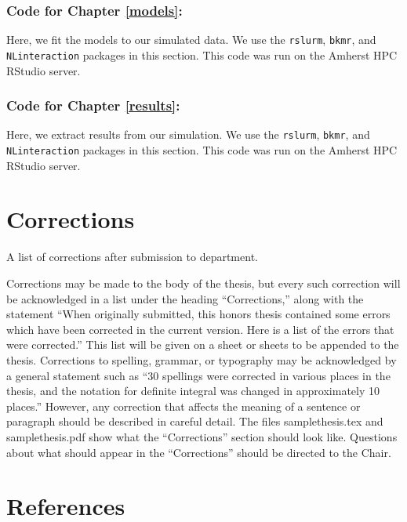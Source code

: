 \documentclass[12pt, twoside]{amherstthesis}
\begin{document}
\hypertarget{code-for-chapter-refmodels}{%
\subsection{Code for Chapter \ref{models}:}\label{code-for-chapter-refmodels}}

Here, we fit the models to our simulated data. We use the \texttt{rslurm}, \texttt{bkmr}, and \texttt{NLinteraction} packages in this section. This code was run on the Amherst HPC RStudio server.

\hypertarget{code-for-chapter-refresults}{%
\subsection{Code for Chapter \ref{results}:}\label{code-for-chapter-refresults}}

Here, we extract results from our simulation. We use the \texttt{rslurm}, \texttt{bkmr}, and \texttt{NLinteraction} packages in this section. This code was run on the Amherst HPC RStudio server.

\hypertarget{corrections}{%
\chapter*{Corrections}\label{corrections}}

A list of corrections after submission to department.

Corrections may be made to the body of the thesis, but every such correction will be acknowledged in a list under the heading ``Corrections,'' along with the statement ``When originally submitted, this honors thesis contained some errors which have been corrected in the current version. Here is a list of the errors that were corrected.'' This list will be given on a sheet or sheets to be appended to the thesis. Corrections to spelling, grammar, or typography may be acknowledged by a general statement such as ``30 spellings were corrected in various places in the thesis, and the notation for definite integral was changed in approximately 10 places.'' However, any correction that affects the meaning of a sentence or paragraph should be described in careful detail. The files samplethesis.tex and samplethesis.pdf show what the ``Corrections'' section should look like. Questions about what should appear in the ``Corrections'' should be directed to the Chair.

\backmatter

\hypertarget{references}{%
\chapter*{References}\label{references}}
\end{document}
